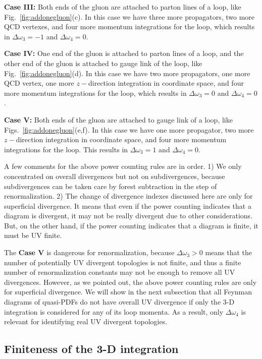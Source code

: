 \textbf{Case III:} Both ends of the gluon are attached to parton lines of a loop, like Fig.~\ref{fig:addonegluon}(c). In this case we have three more propagators, two more QCD vertexes, and four more momentum integrations for the loop, which results in $\Delta\omega_3=-1$ and $\Delta\omega_4=0$.

\textbf{Case IV:} One end of the gluon is attached to parton lines of a loop, and the other end of the gluon is attached to gauge link of the loop, like Fig.~\ref{fig:addonegluon}(d). In this case we have two more propagators, one more QCD vertex, one more $z-$direction integration in coordinate space, and four more momentum integrations for the loop, which results in $\Delta\omega_3=0$ and $\Delta\omega_4=0$.

\textbf{Case V:} Both ends of the gluon are attached to gauge link of a loop, like Figs.~\ref{fig:addonegluon}(e,f). In this case we have one more propagator, two more $z-$direction integration in coordinate space, and four more momentum integrations for the loop. This results in $\Delta\omega_3= 1$ and $\Delta\omega_4=0$.

A few comments for the above power counting rules are in order.
1) We only concentrated on overall divergences but not on subdivergences, because subdivergences can be taken care by forest subtraction in the step of renormalization. 2) The change of divergence indexes discussed here are only for superficial divergence. It means that even if the power counting indicates that a diagram is divergent, it may not be really divergent due to other considerations. But, on the other hand, if the power counting indicates that a diagram is finite, it must be UV finite.

The \textbf{Case V} is dangerous for renormalization, because $\Delta\omega_3>0$ means that the number of potentially UV divergent topologies is not finite, and thus a finite number of renormalization constants may not be enough to remove all UV divergences. However, as we pointed out, the above power counting rules are only for superficial divergence. We will show in the next subsection that all Feynman diagrams of quasi-PDFs do not have overall UV divergence if only the 3-D integration is considered for any of its loop momenta. As a result, only $\Delta\omega_4$ is relevant for identifying real UV divergent topologies.

\subsection{Finiteness of the 3-D integration}

